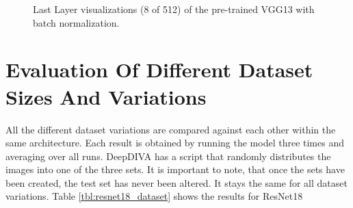 \begin{figure}[H]
\centering
\caption{Last Layer visualizations (8 of 512) of the pre-trained VGG13 with batch normalization.}
\label{fig:vgg13_g_filter_activation}
\end{figure}













\section{Evaluation Of Different Dataset Sizes And Variations}

All the different dataset variations are compared against each other within the same architecture. Each result is obtained by running the model three times and averaging over all runs. DeepDIVA has a script that randomly distributes the images into one of the three sets. It is important to note, that once the sets have been created, the test set has never been altered. It stays the same for all dataset variations. Table \ref{tbl:resnet18_dataset} shows the results for ResNet18

